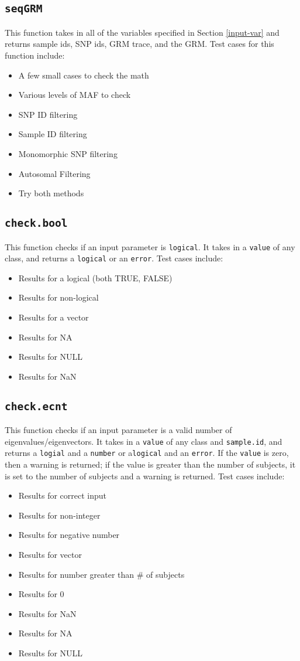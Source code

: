 \documentclass[11pt]{article}
\begin{document}
\subsection{\texttt{seqGRM}}
This function takes in all of the variables specified in Section \ref{input-var} and returns sample ids, SNP ids, GRM trace, and the GRM. Test cases for this function include:
\begin{itemize}
\item A few small cases to check the math
\item Various levels of MAF to check
\item SNP ID filtering
\item Sample ID filtering
\item Monomorphic SNP filtering
\item Autosomal Filtering
\item Try both methods
\end{itemize}

\subsection{\texttt{check.bool}}
This function checks if an input parameter is \texttt{logical}. It takes in a \texttt{value} of any class, and returns a \texttt{logical} or an \texttt{error}. Test cases include:
\begin{itemize}
	\item Results for a logical (both TRUE, FALSE)
	\item Results for non-logical
	\item Results for a vector
	\item Results for NA
	\item Results for NULL
	\item Results for NaN
\end{itemize}

\subsection{\texttt{check.ecnt}}
This function checks if an input parameter is a valid number of eigenvalues/eigenvectors. It takes in a \texttt{value} of any class and \texttt{sample.id}, and returns a \texttt{logial} and a \texttt{number} or a\texttt{logical} and an \texttt{error}. If the \texttt{value} is zero, then a warning is returned; if the value is greater than the number of subjects, it is set to the number of subjects and a warning is returned. Test cases include:
\begin{itemize}
	\item Results for correct input
	\item Results for non-integer
	\item Results for negative number
	\item Results for vector
	\item Results for number greater than \# of subjects
	\item Results for 0
	\item Results for NaN
	\item Results for NA
	\item Results for NULL
\end{itemize}
\end{document}
